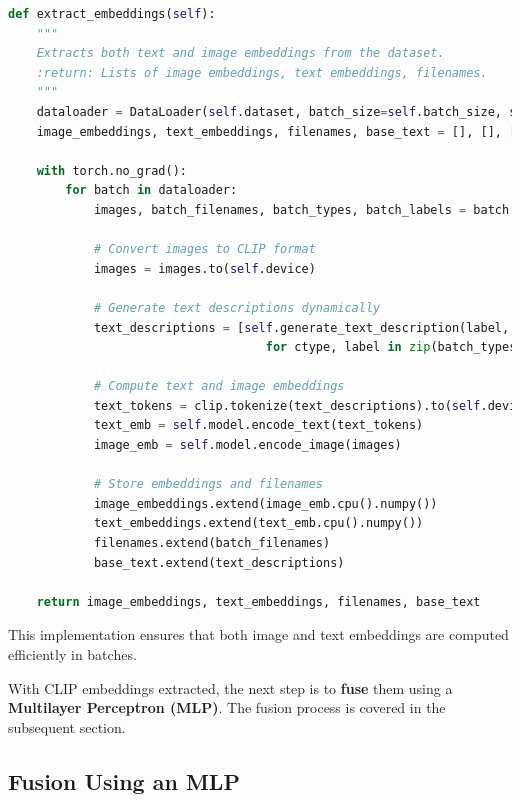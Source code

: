 \documentclass[nolibertine, english, algorithm, nomencl, minted]{ttlab-qualify}
\begin{document}
\begin{footnotesize}
\begin{center}
\begin{tcolorbox}[colback=gray!10, colframe=black, arc=5mm]
\begin{lstlisting}[language=Python, breaklines=true]
def extract_embeddings(self):
    """
    Extracts both text and image embeddings from the dataset.
    :return: Lists of image embeddings, text embeddings, filenames.
    """
    dataloader = DataLoader(self.dataset, batch_size=self.batch_size, shuffle=False)
    image_embeddings, text_embeddings, filenames, base_text = [], [], [], []

    with torch.no_grad():
        for batch in dataloader:
            images, batch_filenames, batch_types, batch_labels = batch

            # Convert images to CLIP format
            images = images.to(self.device)

            # Generate text descriptions dynamically
            text_descriptions = [self.generate_text_description(label, ctype) 
                                    for ctype, label in zip(batch_types, batch_labels)]

            # Compute text and image embeddings
            text_tokens = clip.tokenize(text_descriptions).to(self.device)
            text_emb = self.model.encode_text(text_tokens)
            image_emb = self.model.encode_image(images)

            # Store embeddings and filenames
            image_embeddings.extend(image_emb.cpu().numpy())
            text_embeddings.extend(text_emb.cpu().numpy())
            filenames.extend(batch_filenames)
            base_text.extend(text_descriptions)

    return image_embeddings, text_embeddings, filenames, base_text
\end{lstlisting}
\end{tcolorbox}
\end{center}
\end{footnotesize}

This implementation ensures that both image and text embeddings are computed efficiently in batches.

With CLIP embeddings extracted, the next step is to \textbf{fuse} them using a \textbf{Multilayer Perceptron (MLP)}. 
The fusion process is covered in the subsequent section.

\subsection{Fusion Using an MLP}
\end{document}
